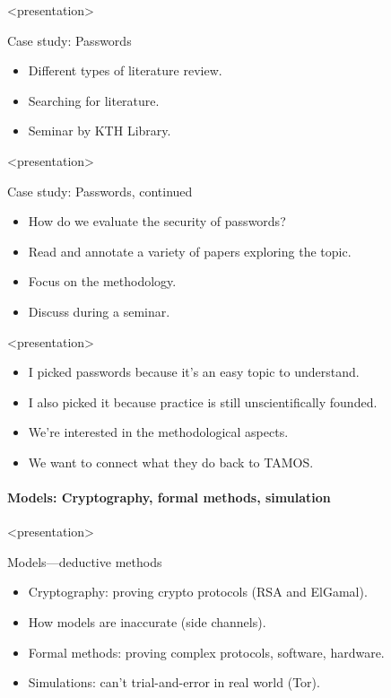 \begin{frame}<presentation>
  \begin{block}{Case study: Passwords}
    \begin{itemize}
      \item Different types of literature review.
      \item Searching for literature.
      \item Seminar by KTH Library.
    \end{itemize}
  \end{block}
\end{frame}

\begin{frame}<presentation>
  \begin{block}{Case study: Passwords, continued}
    \begin{itemize}
      \item How do we evaluate the security of passwords?
      \item Read and annotate a variety of papers exploring the topic.
      \item Focus on the methodology.
      \item Discuss during a seminar.
    \end{itemize}
  \end{block}
\end{frame}

\begin{frame}<presentation>
  \begin{remark}
    \begin{itemize}
      \item I picked passwords because it's an easy topic to understand.
      \item I also picked it because practice is still unscientifically 
        founded.
      \item We're interested in the methodological aspects.
      \item We want to connect what they do back to TAMOS.
    \end{itemize}
  \end{remark}
\end{frame}

\paragraph{Models: Cryptography, formal methods, simulation}

\begin{frame}<presentation>
  \begin{block}{Models---deductive methods}
    \begin{itemize}
      \item Cryptography: proving crypto protocols (RSA and ElGamal).
      \item How models are inaccurate (side channels).
      \item Formal methods: proving complex protocols, software, hardware.
      \item Simulations: can't trial-and-error in real world (Tor).
    \end{itemize}
  \end{block}
\end{frame}


